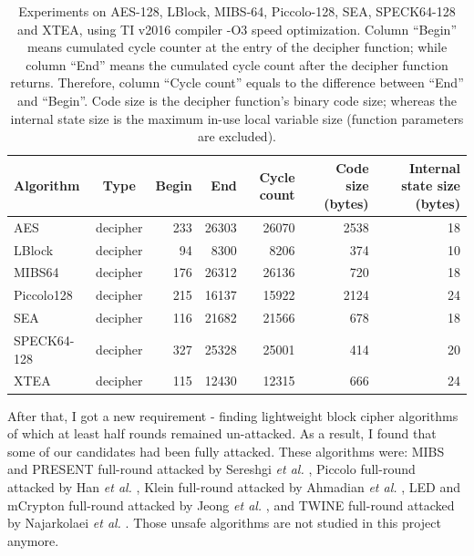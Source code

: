 \documentclass[sigconf, review=false]{acmart}
\begin{document}
\begin{table}[tbp]
\centering
\caption{Experiments on AES-128, LBlock, MIBS-64, Piccolo-128, SEA, SPECK64-128 and XTEA,
using TI v2016 compiler -O3 speed optimization.
Column ``Begin'' means cumulated cycle counter at the entry of the decipher function;
while column ``End'' means the cumulated cycle count after the decipher function returns.
Therefore, column ``Cycle count'' equals to the difference between ``End'' and ``Begin''.
Code size is the decipher function's binary code size;
whereas the internal state size is the maximum in-use local variable size (function parameters are excluded).}
\label{tab-beg}
\begin{tabular}{lcrrrrr}
    \toprule
Algorithm   & Type     & Begin & End   & Cycle count & Code size (bytes) & Internal state size (bytes) \\
    \midrule
AES         & decipher & 233   & 26303 & 26070       & 2538              & 18                          \\
LBlock      & decipher & 94    & 8300  & 8206        & 374               & 10                          \\
MIBS64      & decipher & 176   & 26312 & 26136       & 720               & 18                          \\
Piccolo128  & decipher & 215   & 16137 & 15922       & 2124              & 24                          \\
SEA         & decipher & 116   & 21682 & 21566       & 678               & 18                          \\
SPECK64-128 & decipher & 327   & 25328 & 25001       & 414               & 20                          \\
XTEA        & decipher & 115   & 12430 & 12315       & 666               & 24                          \\
    \bottomrule
\end{tabular}
\end{table}

After that, I got a new requirement - finding lightweight block cipher algorithms of which at least half rounds remained un-attacked.
As a result, I found that some of our candidates had been fully attacked.
These algorithms were: MIBS and PRESENT \cite{bogdanov2007present} full-round attacked by Sereshgi \textit{et al.} \cite{sereshgi2016biclique},
Piccolo full-round attacked by Han \textit{et al.} \cite{han2017improved}, Klein \cite{gong2011klein} full-round attacked by Ahmadian \textit{et al.} \cite{ahmadian2015biclique},
LED \cite{Guo:2011:LBC:2044928.2044958} and mCrypton \cite{lim2005mcrypton} full-round attacked by Jeong \textit{et al.} \cite{jeong2015weakness},
and TWINE \cite{suzaki2012twine} full-round attacked by Najarkolaei \textit{et al.} \cite{najarkolaei2016biclique}.
Those unsafe algorithms are not studied in this project anymore.
\end{document}

